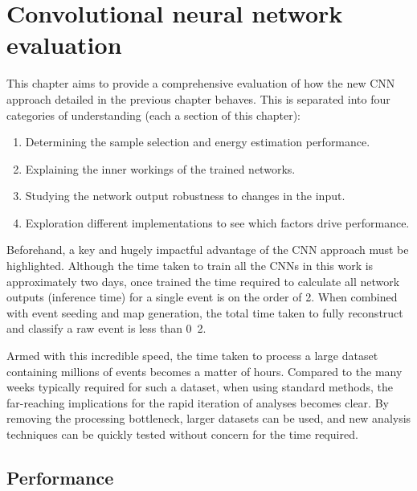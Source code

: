 \chapter{Convolutional neural network evaluation} %
\label{chap:results} %

This chapter aims to provide a comprehensive evaluation of how the new CNN approach detailed in
the previous chapter behaves. This is separated into four categories of understanding (each a
section of this chapter):
\begin{enumerate}
    \item Determining the sample selection and energy estimation performance.
    \item Explaining the inner workings of the trained networks.
    \item Studying the network output robustness to changes in the input.
    \item Exploration different implementations to see which factors drive performance.
\end{enumerate}

Beforehand, a key and hugely impactful advantage of the CNN approach must be highlighted. Although
the time taken to train all the CNNs in this work is approximately two days, once trained the time
required to calculate all network outputs (inference time) for a single event is on the order of
\unit{2}{}. When combined with event seeding and map generation, the total time taken
to fully reconstruct and classify a raw event is less than \unit{0.2}{}.

Armed with this incredible speed, the time taken to process a large dataset containing millions of
events becomes a matter of hours. Compared to the many weeks typically required for such a
dataset, when using standard methods, the far-reaching implications for the rapid iteration of
analyses becomes clear. By removing the processing bottleneck, larger datasets can be used, and
new analysis techniques can be quickly tested without concern for the time required.

\section{Performance} %
\label{sec:results_eval} %

